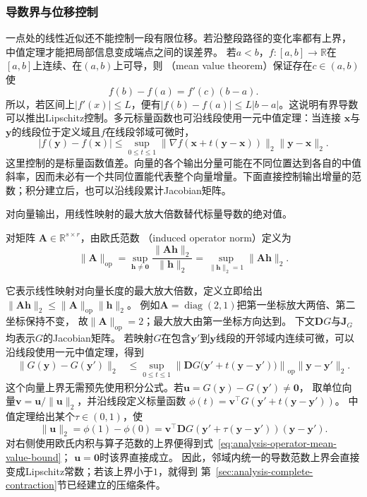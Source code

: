 \subsubsection{导数界与位移控制}

一点处的线性近似还不能控制一段有限位移。若沿整段路径的变化率都有上界，
中值定理才能把局部信息变成端点之间的误差界。
若$a<b$，$f:[a,b]\to\mathbb{R}$在$[a,b]$上连续、在$(a,b)$上可导，则
（mean value theorem）保证存在$c\in(a,b)$使
\begin{equation}
  f(b)-f(a)=f'(c)(b-a).
\label{eq:analysis-mean-value-theorem}
\end{equation}
所以，若区间上$|f'(x)|\leq L$，便有$|f(b)-f(a)|\leq L|b-a|$。这说明有界导数可以推出Lipschitz控制。多元标量函数也可沿线段使用一元中值定理：当连接 $\bm{x}$与$\bm{y}$的线段位于定义域且$f$在线段邻域可微时，
\[   |f(\bm{y})-f(\bm{x})|   \leq   \sup_{0\leq t\leq1}   \lVert\nabla f(\bm{x}+t(\bm{y}-\bm{x}))\rVert_2   \lVert\bm{y}-\bm{x}\rVert_2. \]
这里控制的是标量函数值差。向量的各个输出分量可能在不同位置达到各自的中值斜率，因而未必有一个共同位置能代表整个向量增量。下面直接控制输出增量的范数；积分建立后，也可以沿线段累计Jacobian矩阵。

对向量输出，用线性映射的最大放大倍数替代标量导数的绝对值。
\begin{definition}[欧氏诱导算子范数]
\label{def:analysis-induced-operator-norm}
对矩阵
$\bm{A}\in\mathbb{R}^{s\times r}$，由欧氏范数
（induced operator norm）定义为
\[
  \lVert\bm{A}\rVert_{\mathrm{op}}
  =
  \sup_{\bm{h}\neq\bm{0}}
  \frac{\lVert\bm{A}\bm{h}\rVert_2}{\lVert\bm{h}\rVert_2}
  =
  \sup_{\lVert\bm{h}\rVert_2=1}\lVert\bm{A}\bm{h}\rVert_2.
\]
\end{definition}
它表示线性映射对向量长度的最大放大倍数，定义立即给出
$\lVert\bm{A}\bm{h}\rVert_2
\leq\lVert\bm{A}\rVert_{\mathrm{op}}\lVert\bm{h}\rVert_2$。
例如$\bm A=\operatorname{diag}(2,1)$把第一坐标放大两倍、第二坐标保持不变，
故$\lVert\bm A\rVert_{\mathrm{op}}=2$；最大放大由第一坐标方向达到。
下文$\bm DG$与$\bm J_G$均表示$G$的Jacobian矩阵。
若映射$G$在包含$\bm{y}'$到$\bm{y}$线段的开邻域内连续可微，可以沿线段使用一元中值定理，得到
\begin{equation}
  \begin{aligned}
  \lVert G(\bm{y})-G(\bm{y}')\rVert_2
  &\leq
  \sup_{0\leq t\leq1}
  \left\lVert
    \bm{D}G\bigl(\bm{y}'+t(\bm{y}-\bm{y}')\bigr)
  \right\rVert_{\mathrm{op}}
  \lVert\bm{y}-\bm{y}'\rVert_2.
  \end{aligned}
\label{eq:analysis-operator-mean-value-bound}
\end{equation}
这个向量上界无需预先使用积分公式。若$\bm u=G(\bm y)-G(\bm y')\neq\bm0$，
取单位向量$\bm v=\bm u/\lVert\bm u\rVert_2$，并沿线段定义标量函数
$\phi(t)=\bm v^\top G(\bm y'+t(\bm y-\bm y'))$。
中值定理给出某个$\tau\in(0,1)$，使
\[
 \lVert\bm u\rVert_2
 =\phi(1)-\phi(0)
 =\bm v^\top\bm DG(\bm y'+\tau(\bm y-\bm y'))(\bm y-\bm y').
\]
对右侧使用欧氏内积与算子范数的上界便得到式~\eqref{eq:analysis-operator-mean-value-bound}；
$\bm u=\bm0$时该界直接成立。
因此，邻域内统一的导数范数上界会直接变成Lipschitz常数；若该上界小于$1$，就得到
第~\ref{sec:analysis-complete-contraction}节已经建立的压缩条件。

